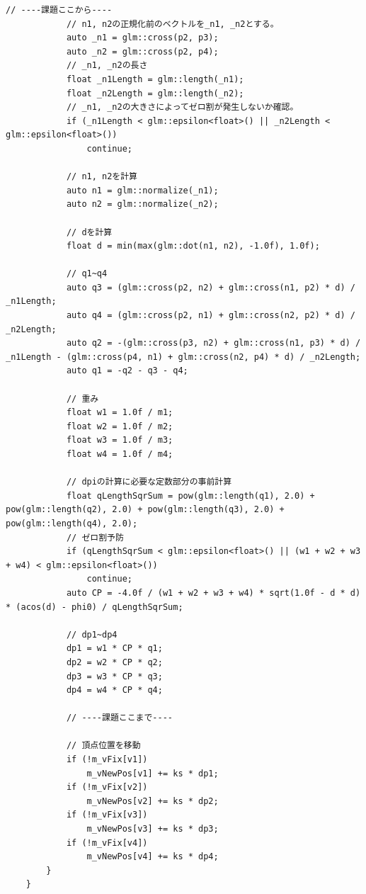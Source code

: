 \documentclass[a4paper,10pt,uplatex,dvipdfmx]{jsarticle}
\begin{document}
\begin{lstlisting}[caption=pbd.cppのprojectBendingConstraint関数]
			// ----課題ここから----
			// n1, n2の正規化前のベクトルを_n1, _n2とする。
			auto _n1 = glm::cross(p2, p3);
			auto _n2 = glm::cross(p2, p4);
			// _n1, _n2の長さ
			float _n1Length = glm::length(_n1);
			float _n2Length = glm::length(_n2);
			// _n1, _n2の大きさによってゼロ割が発生しないか確認。
			if (_n1Length < glm::epsilon<float>() || _n2Length < glm::epsilon<float>())
				continue;
	
			// n1, n2を計算
			auto n1 = glm::normalize(_n1);
			auto n2 = glm::normalize(_n2);
	
			// dを計算
			float d = min(max(glm::dot(n1, n2), -1.0f), 1.0f);
	
			// q1~q4
			auto q3 = (glm::cross(p2, n2) + glm::cross(n1, p2) * d) / _n1Length;
			auto q4 = (glm::cross(p2, n1) + glm::cross(n2, p2) * d) / _n2Length;
			auto q2 = -(glm::cross(p3, n2) + glm::cross(n1, p3) * d) / _n1Length - (glm::cross(p4, n1) + glm::cross(n2, p4) * d) / _n2Length;
			auto q1 = -q2 - q3 - q4;
	
			// 重み
			float w1 = 1.0f / m1;
			float w2 = 1.0f / m2;
			float w3 = 1.0f / m3;
			float w4 = 1.0f / m4;
	
			// dpiの計算に必要な定数部分の事前計算
			float qLengthSqrSum = pow(glm::length(q1), 2.0) + pow(glm::length(q2), 2.0) + pow(glm::length(q3), 2.0) + pow(glm::length(q4), 2.0);
			// ゼロ割予防
			if (qLengthSqrSum < glm::epsilon<float>() || (w1 + w2 + w3 + w4) < glm::epsilon<float>())
				continue;
			auto CP = -4.0f / (w1 + w2 + w3 + w4) * sqrt(1.0f - d * d) * (acos(d) - phi0) / qLengthSqrSum;
	
			// dp1~dp4
			dp1 = w1 * CP * q1;
			dp2 = w2 * CP * q2;
			dp3 = w3 * CP * q3;
			dp4 = w4 * CP * q4;
	
			// ----課題ここまで----
	
			// 頂点位置を移動
			if (!m_vFix[v1])
				m_vNewPos[v1] += ks * dp1;
			if (!m_vFix[v2])
				m_vNewPos[v2] += ks * dp2;
			if (!m_vFix[v3])
				m_vNewPos[v3] += ks * dp3;
			if (!m_vFix[v4])
				m_vNewPos[v4] += ks * dp4;
		}
	}
\end{lstlisting}
\end{document}

